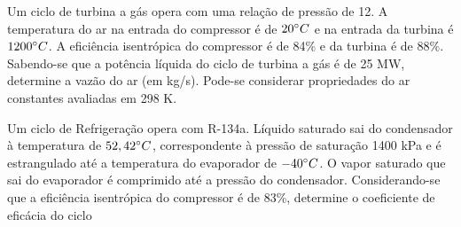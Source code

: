 \documentclass[answers]{exam}
\begin{document}
\begin{multicols}{2}
\begin{questions}
    \question Um ciclo de turbina a gás opera com uma relação de pressão de 12. A temperatura do ar na entrada do compressor é de $20\degree C$ e na entrada da turbina é $1200\degree C$. A eficiência isentrópica do compressor é de 84\% e da turbina é de 88\%. Sabendo-se que a potência líquida do ciclo de turbina a gás é de 25 MW, determine a vazão do ar (em kg/s). Pode-se considerar propriedades do ar constantes avaliadas em 298 K.



    \question Um ciclo de Refrigeração opera com R-134a. Líquido saturado sai do condensador à temperatura de $52,42\degree C$, correspondente à pressão de saturação 1400 kPa e é estrangulado até a temperatura do evaporador de $-40\degree C$. O vapor saturado que sai do evaporador é comprimido até a pressão do condensador. Considerando-se que a eficiência isentrópica do compressor é de 83\%, determine o coeficiente de eficácia do ciclo
  \end{questions}
\end{multicols}
\end{document}
